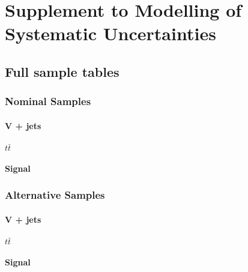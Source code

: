 \chapter{Supplement to Modelling of Systematic Uncertainties}
\label{app:syst-summary}

\section{Full sample tables}
\label{app:full-nominal-samples}
\subsection{Nominal Samples}
\subsubsection{V + jets}



\subsubsection{\texorpdfstring{$t\bar{t}$}{tt}}

\subsubsection{Signal}


\subsection{Alternative Samples}
\subsubsection{V + jets}


\subsubsection{\texorpdfstring{$t\bar{t}$}{tt}}

\subsubsection{Signal}


